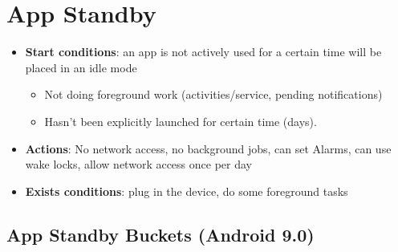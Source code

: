 \documentclass{article}
\begin{document}
\section{App Standby}

\begin{itemize}
  \item \textbf{Start conditions}: an app is not actively used for a certain time will be placed in an idle mode
  \begin{itemize}
    \item Not doing foreground work (activities/service, pending notifications)
    \item Hasn’t been explicitly launched for certain time (days). 
  \end{itemize}
  \item \textbf{Actions}: No network access, no background jobs, can set Alarms, can use wake locks, allow network access once per day 
  \item \textbf{Exists conditions}: plug in the device, do some foreground tasks
\end{itemize}

\subsection{App Standby Buckets (Android 9.0)}
\end{document}
